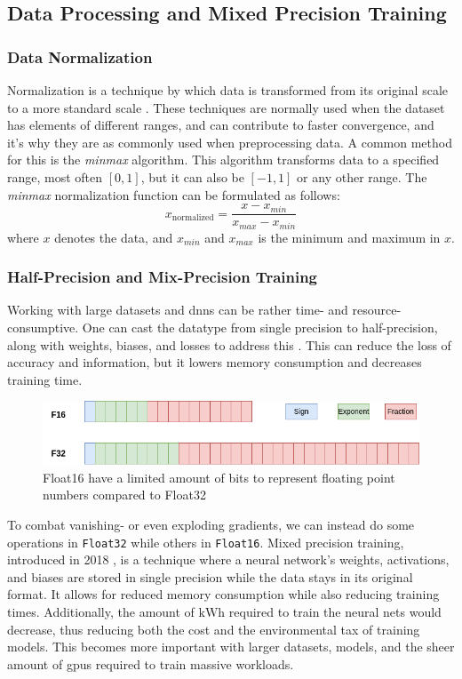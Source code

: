 \subsection{Data Processing and Mixed Precision Training}
\label{back:data}

\subsubsection{Data Normalization}

Normalization is a technique by which data is transformed from its original scale to a more standard scale \cite{ali2014data}. These techniques are normally used when the dataset has elements of different ranges, and can contribute to faster convergence, and it's why they are as commonly used when preprocessing data. A common method for this is the \textit{minmax} algorithm. This algorithm transforms data to a specified range, most often $[0, 1]$, but it can also be $[-1, 1]$ or any other range. The \textit{minmax} normalization function can be formulated as follows:
\begin{equation}
   x_{\text{normalized}} = \dfrac{x - x_{min}}{x_{max}-x_{min}}
\end{equation}
where $x$ denotes the data, and $x_{min}$ and $x_{max}$ is the minimum and maximum in $x$. 
%
\subsubsection{Half-Precision and Mix-Precision Training}

Working with large datasets and \acrshort{dnn}s can be rather time- and resource-consumptive. One can cast the datatype from single precision to half-precision, along with weights, biases, and losses to address this \cite{micikevicius2018mixed}. This can reduce the loss of accuracy and information, but it lowers memory consumption and decreases training time. \\

\begin{figure}[!h]
    \centering
    \includegraphics[width=0.8\linewidth]{figures/floats.png}
    \caption{Float16 have a limited amount of bits to represent floating point numbers compared to Float32}
    \label{fig:floats}
\end{figure}
To combat vanishing- or even exploding gradients, we can instead do some operations in \texttt{Float32} while others in \texttt{Float16}. Mixed precision training, introduced in 2018 \cite{micikevicius2018mixed}, is a technique where a neural network's weights, activations, and biases are stored in single precision while the data stays in its original format. It allows for reduced memory consumption while also reducing training times. Additionally, the amount of $\si{\kilo\watt\hour}$ required to train the neural nets would decrease, thus reducing both the cost and the environmental tax of training models. This becomes more important with larger datasets, models, and the sheer amount of \acrshort{gpu}s required to train massive workloads.
%
